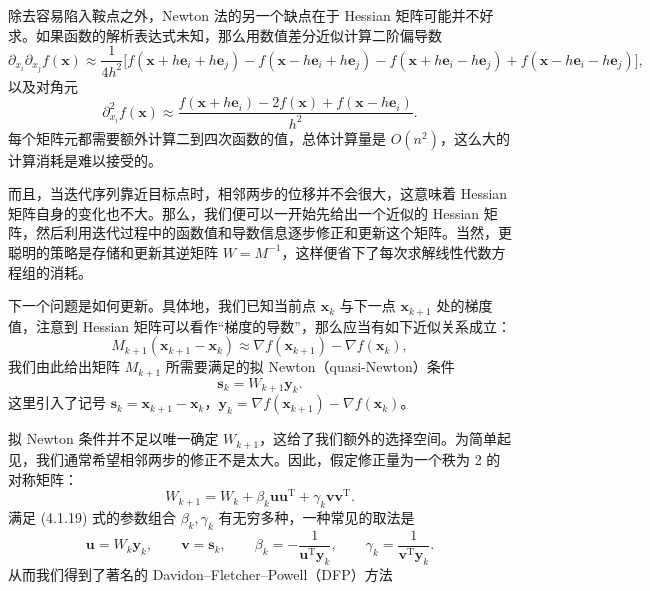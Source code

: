 除去容易陷入鞍点之外，Newton 法的另一个缺点在于 Hessian 矩阵可能并不好求。如果函数的解析表达式未知，那么用数值差分近似计算二阶偏导数
\begin{equation}
\partial_{x_i}\partial_{x_j}f(\bm x)\approx \frac{1}{4h^2}\bigl[
 f(\bm x+h\bm e_i+h\bm e_j)-f(\bm x-h\bm e_i+h\bm e_j)
-f(\bm x+h\bm e_i-h\bm e_j)+f(\bm x-h\bm e_i-h\bm e_j)
\bigr],
\tag{4.1.15}
\end{equation}
以及对角元
\begin{equation}
\partial_{x_i}^2 f(\bm x)\approx
\frac{f(\bm x+h\bm e_i)-2f(\bm x)+f(\bm x-h\bm e_i)}{h^2}.
\tag{4.1.16}
\end{equation}
每个矩阵元都需要额外计算二到四次函数的值，总体计算量是 $O(n^2)$，这么大的计算消耗是难以接受的。

而且，当迭代序列靠近目标点时，相邻两步的位移并不会很大，这意味着 Hessian 矩阵自身的变化也不大。那么，我们便可以一开始先给出一个近似的 Hessian 矩阵，然后利用迭代过程中的函数值和导数信息逐步修正和更新这个矩阵。当然，更聪明的策略是存储和更新其逆矩阵 $W=M^{-1}$，这样便省下了每次求解线性代数方程组的消耗。

下一个问题是如何更新。具体地，我们已知当前点 $\bm x_k$ 与下一点 $\bm x_{k+1}$ 处的梯度值，注意到 Hessian 矩阵可以看作“梯度的导数”，那么应当有如下近似关系成立：
\begin{equation}
M_{k+1}(\bm x_{k+1}-\bm x_k)\approx \nabla f(\bm x_{k+1})-\nabla f(\bm x_k),
\tag{4.1.17}
\end{equation}
我们由此给出矩阵 $M_{k+1}$ 所需要满足的拟 Newton（quasi-Newton）条件
\begin{equation}
\bm s_k=W_{k+1}\bm y_k.
\tag{4.1.18}
\end{equation}
这里引入了记号 $\bm s_k=\bm x_{k+1}-\bm x_k$，$\bm y_k=\nabla f(\bm x_{k+1})-\nabla f(\bm x_k)$。

拟 Newton 条件并不足以唯一确定 $W_{k+1}$，这给了我们额外的选择空间。为简单起见，我们通常希望相邻两步的修正不是太大。因此，假定修正量为一个秩为 2 的对称矩阵：
\begin{equation}
W_{k+1}=W_k+\beta_k\bm u\bm u^{\mathrm T}+\gamma_k\bm v\bm v^{\mathrm T}.
\tag{4.1.19}
\end{equation}
满足 (4.1.19) 式的参数组合 $\beta_k,\gamma_k$ 有无穷多种，一种常见的取法是
\begin{equation}
\bm u=W_k\bm y_k,\qquad \bm v=\bm s_k,\qquad
\beta_k=-\frac{1}{\bm u^{\mathrm T}\bm y_k},\qquad
\gamma_k=\frac{1}{\bm v^{\mathrm T}\bm y_k}.
\tag{4.1.20}
\end{equation}
\enlargethispage{1.5\baselineskip}
从而我们得到了著名的 Davidon--Fletcher--Powell（DFP）方法


